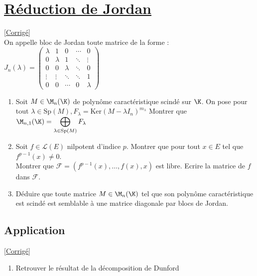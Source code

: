 \documentclass[8pt]{book}
\begin{document}
\section{\underline{Réduction de Jordan}}
\label{Réduction de Jordan}
\textcolor{blue}{\hyperref[Réduction de Jordan corrigé]{[Corrigé]}}\\
On appelle bloc de Jordan toute matrice de la forme :  $J_n(\lambda) =
\begin{pmatrix}
	\lambda & 1 & 0 & \cdots & 0 \\
	0 & \lambda & 1 & \ddots & \vdots \\
	0 & 0 & \lambda & \ddots & 0 \\
	\vdots & \vdots & \ddots & \ddots & 1 \\
	0 & 0 & \cdots & 0 & \lambda
\end{pmatrix}$

\begin{enumerate}
	\item Soit $M\in\M_n(\K)$ de polynôme caractéristique scindé sur $\K$. On pose pour tout $\lambda\in \text{Sp}(M),$$ F_\lambda=\text{Ker}(M-\lambda I_n)^{m_\lambda}$ Montrer que $\displaystyle\M_{n,1}(\K)=\bigoplus_{\lambda\in\text{Sp}(M)}F_\lambda$
	\item Soit $f\in\mathcal{L}(E)$ nilpotent d'indice $p$. Montrer que pour tout $x\in E$ tel que $f^{p-1}(x)\ne 0$. \\Montrer que $\mathcal{F}=(f^{p-1}(x),\dots,f(x),x)$ est libre. Ecrire la matrice de $f$ dans $\mathcal{F}$.
	\item Déduire que toute matrice $M\in\M_n(\K)$ tel que son polynôme caractéristique est scindé est semblable à une matrice diagonale par blocs de Jordan.
\end{enumerate}

\subsection{Application}
\label{Jordan implique Dunford}
\textcolor{blue}{\hyperref[Jordan implique Dunford corrigé]{[Corrigé]}}\\
\begin{enumerate}
	\item Retrouver le résultat de la décomposition de Dunford
\end{enumerate}
\end{document}
